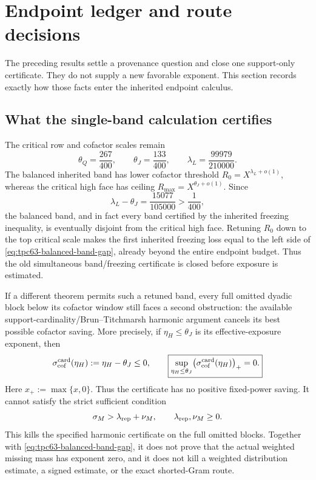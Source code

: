 \section{Endpoint ledger and route decisions}
\label{sec:tpc63-endpoint-decisions}

The preceding results settle a provenance question and close one
support-only certificate.  They do not supply a new favorable exponent.
This section records exactly how those facts enter the inherited endpoint
calculus.

\subsection{What the single-band calculation certifies}

The critical row and cofactor scales remain
\begin{equation}
 \theta_Q=\frac{267}{400},
 \qquad
 \theta_J=\frac{133}{400},
 \qquad
 \lambda_L=\frac{99979}{210000}.
 \label{eq:tpc63-critical-scale-exponents}
\end{equation}
The balanced inherited band has lower cofactor threshold
\(R_0=X^{\lambda_L+o(1)}\), whereas the critical high face has ceiling
\(R_{\max}=X^{\theta_J+o(1)}\).  Since
\begin{equation}
 \lambda_L-\theta_J
 =\frac{15077}{105000}>\frac1{400},
 \label{eq:tpc63-balanced-band-gap}
\end{equation}
the balanced band, and in fact every band certified by the inherited
freezing inequality, is eventually disjoint from the critical high face.
Retuning \(R_0\) down to the top critical scale makes the first inherited
freezing loss equal to the left side of
\eqref{eq:tpc63-balanced-band-gap}, already beyond the entire endpoint
budget.  Thus the old simultaneous band/freezing certificate is closed
before exposure is estimated.

If a different theorem permits such a retuned band, every full omitted
dyadic block below its cofactor window still faces a second obstruction: the
available support-cardinality/Brun--Titchmarsh harmonic argument cancels
its best possible cofactor saving.  More precisely, if
\(\eta_H\le\theta_J\) is its effective-exposure exponent, then
\begin{equation}
 \sigma_{\rm cof}^{\rm card}(\eta_H)
 :=\eta_H-\theta_J\le0,
 \qquad
 \boxed{\sup_{\eta_H\le\theta_J}
        \bigl(\sigma_{\rm cof}^{\rm card}(\eta_H)\bigr)_+=0.}
 \label{eq:tpc63-cardinality-certified-saving}
\end{equation}
Here \(x_+:=\max\{x,0\}\).  Thus the certificate has no positive
fixed-power saving.
It cannot satisfy the strict sufficient condition
\begin{equation}
 \sigma_M>\lambda_{\rm rep}+\nu_M,
 \qquad \lambda_{\rm rep},\nu_M\ge0.
 \label{eq:tpc63-restricted-product-test}
\end{equation}
This kills the specified harmonic certificate on the full omitted blocks.
Together with \eqref{eq:tpc63-balanced-band-gap}, it does
not prove that the actual weighted missing mass has exponent zero, and it
does not kill a weighted distribution estimate, a signed estimate, or the
exact shorted-Gram route.

